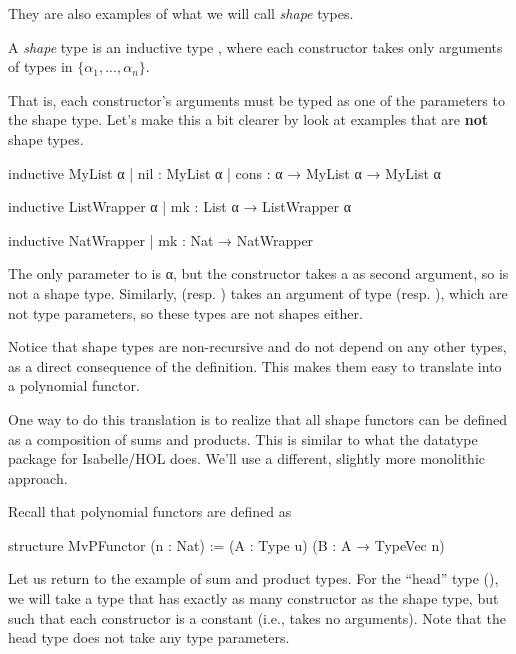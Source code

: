 \documentclass[titlepage]{report}
\newenvironment{definition}[1][Definition:]{\begin{trivlist}                         
    \item[\hskip \labelsep {\bfseries #1}]}{\end{trivlist}}
\newenvironment{remark}{%
\begin{framed}
\begin{trivlist}
    \item[\hskip \labelsep {\bfseries Remark:}]}%
{%
\end{trivlist}%
\end{framed}
}
\begin{document}
They are also examples of what we will call \emph{shape} types.
\begin{definition}
    A \emph{shape} type is an inductive type , 
    where each constructor takes only arguments of types in $\{α_1, ..., α_n\}$.
\end{definition}
That is, each constructor's arguments must be typed as one of the parameters to the shape type.
Let's make this a bit clearer by look at examples that are \textbf{not} shape types. 

\begin{leancode}
    inductive MyList α
      | nil  : MyList α 
      | cons : α → MyList α → MyList α

    inductive ListWrapper α
      | mk : List α → ListWrapper α

    inductive NatWrapper
      | mk : Nat → NatWrapper
\end{leancode}

The only parameter to  is α, but the  constructor takes a  as second argument,
so  is not a shape type.
Similarly,  (resp. ) takes an argument of type  (resp. ),
which are not type parameters, so these types are not shapes either.

Notice that shape types are non-recursive and do not depend on any other types, as a direct consequence 
of the definition. This makes them easy to translate into a polynomial functor. 

\begin{remark}
    One way to do this translation is to realize that all shape functors can be defined as a
    composition of sums and products. 
    This is similar to what the datatype package for Isabelle/HOL does.
    We'll use a different, slightly more monolithic approach.
\end{remark}

Recall that polynomial functors are defined as
\begin{leancode}
    structure MvPFunctor (n : Nat) :=
      (A : Type u) (B : A → TypeVec n)
\end{leancode}


Let us return to the example of sum and product types. 
For the ``head'' type (), we will take a type that has exactly as many constructor as
the shape type, but such that each constructor is a constant (i.e., takes no arguments).
Note that the head type does not take any type parameters. 
\end{document}
